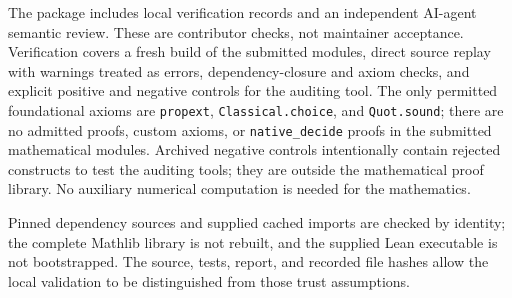 \documentclass[11pt]{article}
\begin{document}
The package includes local verification records and an independent AI-agent
semantic review. These are contributor checks, not maintainer acceptance.
Verification covers a fresh build of the submitted modules, direct source
replay with warnings treated as errors, dependency-closure and axiom checks,
and explicit positive and negative controls for the auditing tool. The only
permitted foundational axioms are \texttt{propext}, \texttt{Classical.choice},
and \texttt{Quot.sound}; there are no admitted proofs, custom axioms, or
\texttt{native\_decide} proofs in the submitted mathematical modules.
Archived negative controls intentionally contain rejected constructs to test
the auditing tools; they are outside the mathematical proof library.
No auxiliary numerical computation is needed for the mathematics.

Pinned dependency sources and supplied cached imports are checked by identity;
the complete Mathlib library is not rebuilt, and the supplied Lean executable
is not bootstrapped. The source, tests, report, and recorded file hashes allow
the local validation to be distinguished from those trust assumptions.
\end{document}
